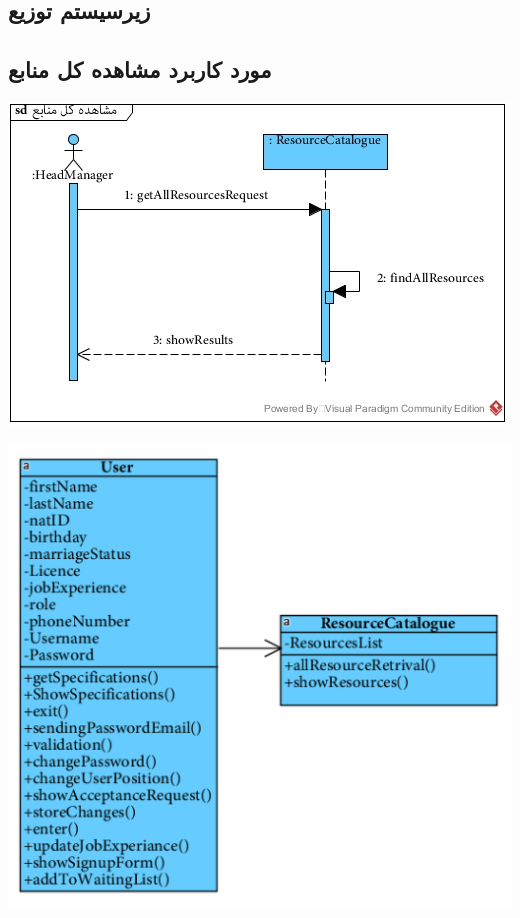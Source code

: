 \newpage
\subsection{زیرسیستم توزیع}
\vspace{1cm}
\subsection*{مورد کاربرد مشاهده کل منابع}
\vspace{1cm}
\begin{center}
\includegraphics[width=\textwidth]{SequenceDiagrams/35.jpg}
\end{center}

\newpage
\vspace{2cm}
\begin{center}
\includegraphics[width=\textwidth]{SequenceClasses/35.png}
\end{center}

